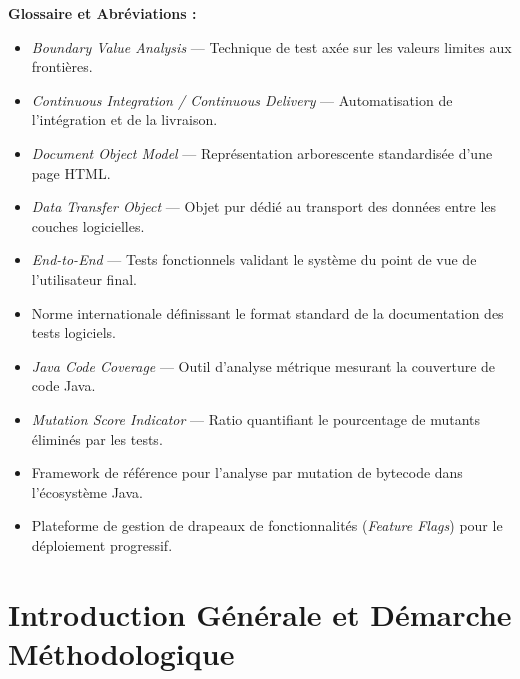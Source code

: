\documentclass[11pt, a4paper, openany]{report}
\begin{document}
\vspace{0.4cm}
\noindent \textbf{Glossaire et Abréviations :}
\begin{itemize}[leftmargin=2.5cm, noitemsep, topsep=2pt]
    \item[\textbf{BVA}] \textit{Boundary Value Analysis} --- Technique de test axée sur les valeurs limites aux frontières.
    \item[\textbf{CI/CD}] \textit{Continuous Integration / Continuous Delivery} --- Automatisation de l'intégration et de la livraison.
    \item[\textbf{DOM}] \textit{Document Object Model} --- Représentation arborescente standardisée d'une page HTML.
    \item[\textbf{DTO}] \textit{Data Transfer Object} --- Objet pur dédié au transport des données entre les couches logicielles.
    \item[\textbf{E2E}] \textit{End-to-End} --- Tests fonctionnels validant le système du point de vue de l'utilisateur final.
    \item[\textbf{IEEE 829}] Norme internationale définissant le format standard de la documentation des tests logiciels.
    \item[\textbf{JaCoCo}] \textit{Java Code Coverage} --- Outil d'analyse métrique mesurant la couverture de code Java.
    \item[\textbf{MSI}] \textit{Mutation Score Indicator} --- Ratio quantifiant le pourcentage de mutants éliminés par les tests.
    \item[\textbf{PITest}] Framework de référence pour l'analyse par mutation de bytecode dans l'écosystème Java.
    \item[\textbf{Unleash}] Plateforme de gestion de drapeaux de fonctionnalités (\textit{Feature Flags}) pour le déploiement progressif.
\end{itemize}

\newpage
\tableofcontents
\newpage

\chapter{Introduction Générale et Démarche Méthodologique}
\end{document}
